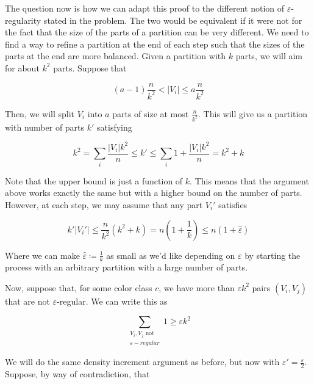\documentclass{amsart}
\theoremstyle{plain}
\theoremstyle{definition}
\begin{document}
    \newpage

    The question now is how we can adapt this proof to the different notion of
    $\varepsilon$-regularity stated in the problem.
    The two would be equivalent if it were not for the fact that the size of the parts of a partition can
    be very different.
    We need to find a way to refine a partition at the end of each step
    such that the sizes of the parts at the end
    are more balanced.
    Given a partition with $k$ parts, we will aim for about $k^2$ parts.
    Suppose that

    \[
        (a - 1) \frac{n}{k^2} < \lvert V_i \rvert \leq a \frac{n}{k^2}
    \]

    Then, we will split $V_i$ into $a$ parts of size at most $\frac{n}{k^2}$.
    This will give us a partition with number of parts $k'$ satisfying

    \[
        k^2 = \sum_{i} \frac{\lvert V_i \rvert k^2}{n} \leq k' \leq \sum_{i} 1 + \frac{\lvert V_i \rvert k^2}{n} = k^2 + k
    \]

    Note that the upper bound is just a function of $k$.
    This means that the argument above works exactly the same but with a higher
    bound on the number of parts.
    However, at each step, we may assume that any part $V_i'$ satisfies

    \begin{equation} \label{eq:bound}
        k' \lvert V_i' \rvert \leq \frac{n}{k^2}(k^2 + k) = n\left(1 + \frac{1}{k}\right) \leq  n\left(1 + \hat{\varepsilon} \right)
    \end{equation}

    Where we can make $\hat{\varepsilon} \coloneqq \frac{1}{k}$ as small as we'd like depending on $\varepsilon$
    by starting the process with an arbitrary partition with a large number of parts.

    Now, suppose that, for some color class $c$, we have more than
    $\varepsilon k^2$ pairs $(V_i, V_j)$ that are not $\varepsilon$-regular.
    We can write this as

    \begin{equation} \label{eq:many_pairs}
        \sum_{\substack{V_i, V_j \text{ not } \\ \varepsilon-regular}} 1 \geq \varepsilon k^2
    \end{equation}

    We will do the same density increment argument as before, but now with $\varepsilon' = \frac{\varepsilon}{2}$.
    Suppose, by way of contradiction, that
\end{document}
